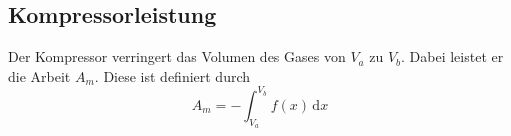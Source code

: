 \subsection{Kompressorleistung}
Der Kompressor verringert das Volumen des Gases von $V_a$ zu $V_b$. Dabei leistet
er die Arbeit $A_m$. Diese ist definiert durch
\begin{equation}
  A_m = - \int_{V_a}^{V_b} f(x) \, \mathrm{d}x
\end{equation}

\label{sec:Theorie}

\cite{sample}
